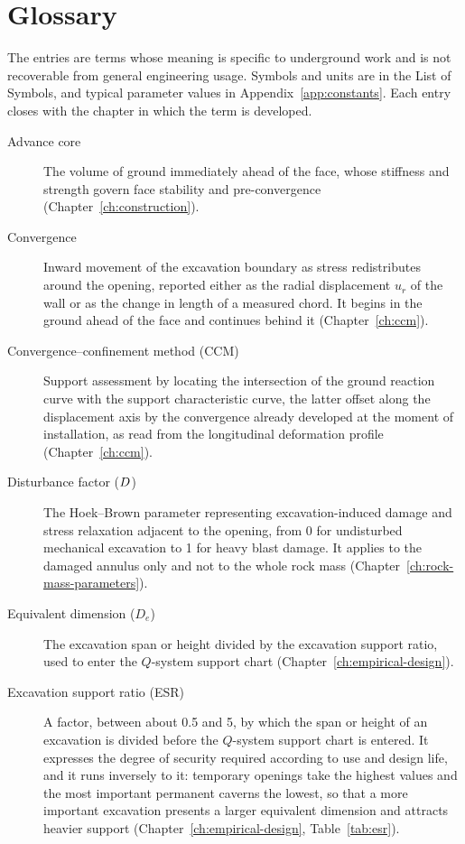 \chapter{Glossary}
\label{app:glossary}

The entries are terms whose meaning is specific to underground work and is
not recoverable from general engineering usage. Symbols and units are in the
List of Symbols, and typical parameter values in
Appendix~\ref{app:constants}. Each entry closes with the chapter in which the
term is developed.

\begin{description}
\item[Advance core] The volume of ground immediately ahead of the face, whose stiffness and strength govern face stability and pre-convergence (Chapter~\ref{ch:construction}).
\item[Convergence] Inward movement of the excavation boundary as stress redistributes around the opening, reported either as the radial displacement $u_r$ of the wall or as the change in length of a measured chord. It begins in the ground ahead of the face and continues behind it (Chapter~\ref{ch:ccm}).
\item[Convergence--confinement method (CCM)] Support assessment by locating the intersection of the ground reaction curve with the support characteristic curve, the latter offset along the displacement axis by the convergence already developed at the moment of installation, as read from the longitudinal deformation profile (Chapter~\ref{ch:ccm}).
\item[Disturbance factor ($D$)] The Hoek--Brown parameter representing excavation-induced damage and stress relaxation adjacent to the opening, from 0 for undisturbed mechanical excavation to 1 for heavy blast damage. It applies to the damaged annulus only and not to the whole rock mass (Chapter~\ref{ch:rock-mass-parameters}).
\item[Equivalent dimension ($D_e$)] The excavation span or height divided by the excavation support ratio, used to enter the $Q$-system support chart (Chapter~\ref{ch:empirical-design}).
\item[Excavation support ratio (ESR)] A factor, between about 0.5 and 5, by which the span or height of an excavation is divided before the $Q$-system support chart is entered. It expresses the degree of security required according to use and design life, and it runs inversely to it: temporary openings take the highest values and the most important permanent caverns the lowest, so that a more important excavation presents a larger equivalent dimension and attracts heavier support (Chapter~\ref{ch:empirical-design}, Table~\ref{tab:esr}).

\end{description}
